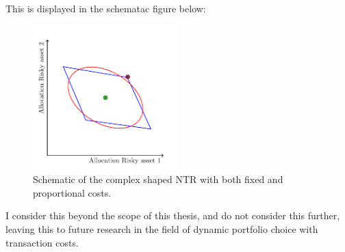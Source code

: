 \documentclass[11pt]{article}
\begin{document}
This is displayed in the schematac figure below:
\begin{figure}[!ht]
    \centering
    \includegraphics[width=0.5\textwidth]{../Sections/Tikz Final Figure.pdf}
    \caption{Schematic of the complex shaped NTR with both fixed and proportional costs.}
    \label{fig: Tikz_Final_TR}
\end{figure}

I consider this beyond the scope of this thesis, and do not consider this further, leaving this to future research in the field of dynamic portfolio choice with transaction costs. 



\ifdefined\COMPILINGMAIN
\else
\end{document}
